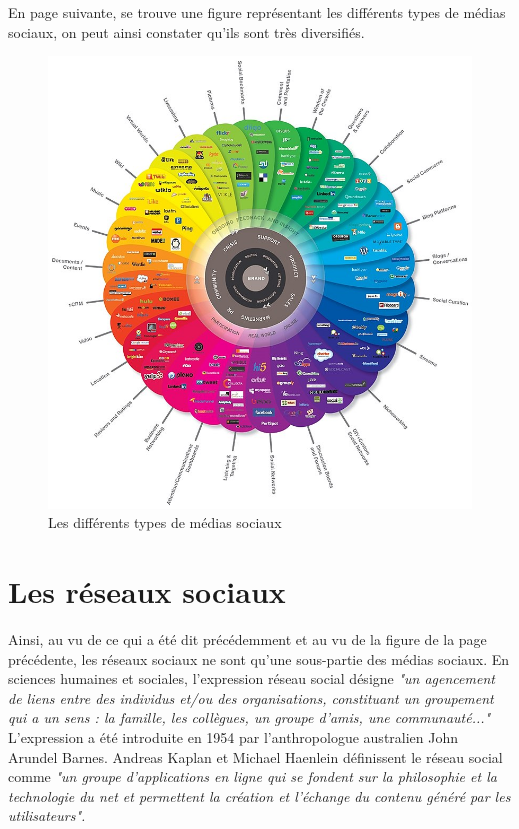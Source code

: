 \documentclass[12pt]{report}
\begin{document}
En page suivante, se trouve une figure représentant les différents types de médias sociaux, on peut ainsi constater qu'ils sont très diversifiés. 

\begin{figure}
\begin{center}
    \includegraphics[width=180mm]{MediasSociaux.jpg}
    \end{center}
    \caption{Les différents types de médias sociaux}
\label{fig:les différents types de médias sociaux}
  \end{figure}

\newpage 
\section{Les réseaux sociaux}
Ainsi, au vu de ce qui a été dit précédemment et au vu de la figure de la page précédente, les réseaux sociaux ne sont qu’une sous-partie des médias sociaux. En sciences humaines et sociales, l'expression réseau social désigne \textit {"un agencement de liens entre des individus et/ou des organisations, constituant un groupement qui a un sens : la famille, les collègues, un groupe d'amis, une communauté..."} \\
L'expression a été introduite en 1954 par l'anthropologue australien John Arundel Barnes. Andreas Kaplan et Michael Haenlein définissent le réseau social comme \textit{"un groupe d’applications en ligne qui se fondent sur la philosophie et la technologie du net et permettent la création et l’échange du contenu généré par les utilisateurs".}\\
\end{document}
